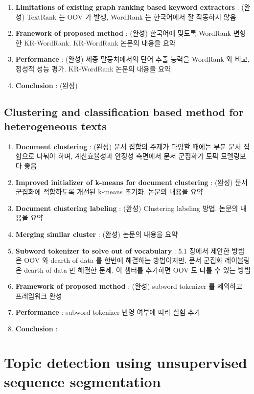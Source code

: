 \documentclass[11pt]{article}
\begin{document}
\begin{enumerate}[noitemsep]
    \item \textbf{Limitations of existing graph ranking based keyword extractors} : (완성) TextRank 는 OOV 가 발생, WordRank 는 한국어에서 잘 작동하지 않음
    \item \textbf{Franework of proposed method} : (완성) 한국어에 맞도록 WordRank 변형한 KR-WordRank. KR-WordRank 논문의 내용을 요약
    \item \textbf{Performance} : (완성) 세종 말뭉치에서의 단어 추출 능력을 WordRank 와 비교, 정성적 성능 평가. KR-WordRank 논문의 내용을 요약
    \item \textbf{Conclusion} : (완성)
\end{enumerate}

\subsection{Clustering and classification based method for heterogeneous texts}

\begin{enumerate}[noitemsep]
    \item \textbf{Document clustering} : (완성) 문서 집합의 주제가 다양할 때에는 부분 문서 집합으로 나눠야 하며, 계산효율성과 안정성 측면에서 문서 군집화가 토픽 모델링보다 좋음
    \item \textbf{Improved initializer of k-means for document clustering} : (완성) 문서 군집화에 적합하도록 개선된 k-means 초기화. 논문의 내용을 요약
    \item \textbf{Document clustering labeling} : (완성) Clustering labeling 방법. 논문의 내용을 요약
    \item \textbf{Merging similar cluster} : (완성) 논문의 내용을 요약
    \item \textbf{Subword tokenizer to solve out of vocabulary} : 5.1 장에서 제안한 방법은 OOV 와 dearth of data 를 한번에 해결하는 방법이지만, 문서 군집화 레이블링은 dearth of data 만 해결한 문제. 이 챕터를 추가하면 OOV 도 다룰 수 있는 방법
    \item \textbf{Framework of proposed method} : (완성) subword tokenizer 를 제외하고 프레임워크 완성
    \item \textbf{Performance} : subword tokenizer 반영 여부에 따라 실험 추가
    \item \textbf{Conclusion} :
\end{enumerate}

\section{Topic detection using unsupervised sequence segmentation}
\end{document}
